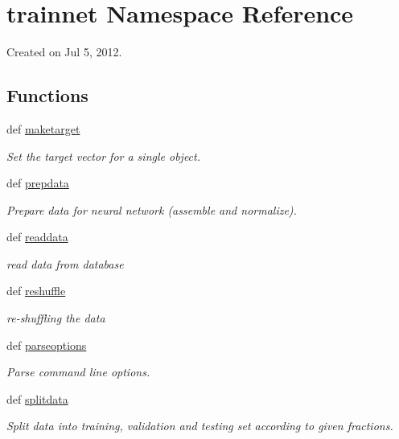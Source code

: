 \hypertarget{namespacetrainnet}{
\section{trainnet Namespace Reference}
\label{namespacetrainnet}
}


Created on Jul 5, 2012.  


\subsection*{Functions}
\begin{DoxyCompactItemize}
\item 
def \hyperlink{namespacetrainnet_af0ab122647716d110c3d20d71bca7517}{maketarget}
\begin{DoxyCompactList}\small\item\em Set the target vector for a single object. \item\end{DoxyCompactList}\item 
def \hyperlink{namespacetrainnet_a3770060027ff2b2ac850672baaedc954}{prepdata}
\begin{DoxyCompactList}\small\item\em Prepare data for neural network (assemble and normalize). \item\end{DoxyCompactList}\item 
def \hyperlink{namespacetrainnet_a6b2a6c6ee5f126bec6cf862ebcee3d7c}{readdata}
\begin{DoxyCompactList}\small\item\em read data from database \item\end{DoxyCompactList}\item 
def \hyperlink{namespacetrainnet_ade5fd81c145ae647da27e5108ecbc83b}{reshuffle}
\begin{DoxyCompactList}\small\item\em re-\/shuffling the data \item\end{DoxyCompactList}\item 
def \hyperlink{namespacetrainnet_a38102ec29b7d6d2fbf74196151247213}{parseoptions}
\begin{DoxyCompactList}\small\item\em Parse command line options. \item\end{DoxyCompactList}\item 
def \hyperlink{namespacetrainnet_af0eeb2aa38d66cbd67256b1b27066ea4}{splitdata}
\begin{DoxyCompactList}\small\item\em Split data into training, validation and testing set according to given fractions. \item\end{DoxyCompactList}\end{DoxyCompactItemize}
